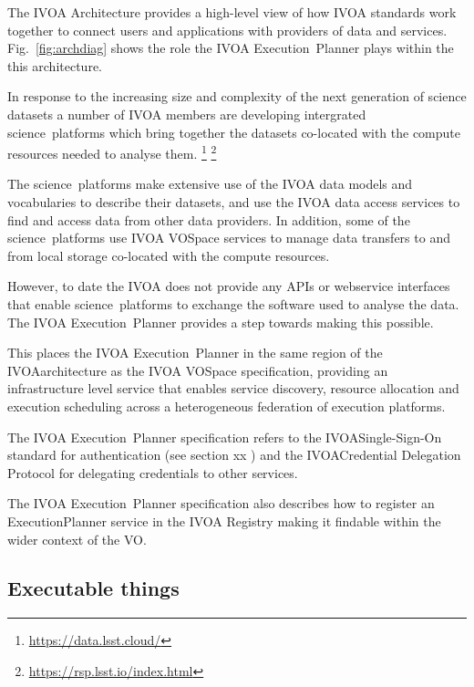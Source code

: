 \documentclass[11pt,a4paper]{ivoa}
\newcommand{\webservice} {webservice}
\newcommand{\ivoa} {IVOA}
\newcommand{\vospace} {VOSpace}
\newcommand{\execplanner} {ExecutionPlanner}
\newcommand{\executionplanner} {Execution~Planner}
\newcommand{\footurl}[1] {\footnote{\url{#1}}}
\newcommand{\dataset} {dataset}
\newcommand{\scienceplatform} {science~platform}
\begin{document}
The IVOA Architecture\citep{2010ivoa.rept.1123A} provides a high-level view of how IVOA
standards work together to connect users and applications with providers of data
and services.
Fig.~\ref{fig:archdiag} shows the role the \ivoa{} \executionplanner{} plays within the this architecture.

In response to the increasing size and complexity of the next generation of science \dataset{}s
a number of \ivoa{} members are developing intergrated \scienceplatform{}s which bring
together the \dataset{}s co-located with the compute resources needed to analyse them.
\footurl{https://data.lsst.cloud/}
\footurl{https://rsp.lsst.io/index.html}

The \scienceplatform{}s make extensive use of the \ivoa{} data models and
vocabularies to describe their \dataset{}s, and use the \ivoa{} data access
services to find and access data from other data providers.
In addition, some of the \scienceplatform{}s use \ivoa{} \vospace{} services to manage
data transfers to and from local storage co-located with the compute resources.

However, to date the \ivoa{} does not provide any APIs or \webservice{} interfaces that
enable \scienceplatform{}s to exchange the software used to analyse the data.
The \ivoa{} \executionplanner{} provides a step towards making this possible.

This places the \ivoa{} \executionplanner{} in the same region of the \ivoa architecture
as the \ivoa{} \vospace{} specification\citep{2009ivoa.specQ1007G},
providing an infrastructure level service that enables service discovery,
resource allocation and execution scheduling across a heterogeneous federation
of execution platforms.

The \ivoa{} \executionplanner{} specification refers to the
\ivoa Single-Sign-On standard\citep{2017ivoa.spec.0524T}
for authentication (see section xx )%
and the
\ivoa Credential Delegation Protocol\citep{2010ivoa.spec.0218P}
for delegating credentials to other services.

The \ivoa{} \executionplanner{} specification also describes how to register
an \execplanner{} service in the
\ivoa{} Registry\citep{2009ivoa.spec.1104B}
making it findable within the wider context of the VO.

\subsection{Executable things}
\label{executablething}
\end{document}
